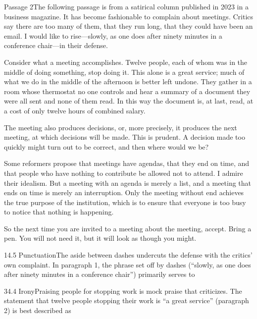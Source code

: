 \documentclass[11pt]{article}
\begin{document}
\begin{passage}{Passage 2}{The following passage is from a satirical column published in 2023 in a business magazine.}
 It has become fashionable to complain about meetings. Critics say there are too many of them, that they run long, that they could have been an email. I would like to rise---slowly, as one does after ninety minutes in a conference chair---in their defense.

 Consider what a meeting accomplishes. Twelve people, each of whom was in the middle of doing something, stop doing it. This alone is a great service; much of what we do in the middle of the afternoon is better left undone. They gather in a room whose thermostat no one controls and hear a summary of a document they were all sent and none of them read. In this way the document is, at last, read, at a cost of only twelve hours of combined salary.

 The meeting also produces decisions, or, more precisely, it produces the next meeting, at which decisions will be made. This is prudent. A decision made too quickly might turn out to be correct, and then where would we be?

 Some reformers propose that meetings have agendas, that they end on time, and that people who have nothing to contribute be allowed not to attend. I admire their idealism. But a meeting with an agenda is merely a list, and a meeting that ends on time is merely an interruption. Only the meeting without end achieves the true purpose of the institution, which is to ensure that everyone is too busy to notice that nothing is happening.

 So the next time you are invited to a meeting about the meeting, accept. Bring a pen. You will not need it, but it will look as though you might.
\end{passage}

\begin{q}{1}{4.5 Punctuation}{The aside between dashes undercuts the defense with the critics' own complaint.}
In paragraph 1, the phrase set off by dashes (``slowly, as one does after ninety minutes in a conference chair'') primarily serves to
\end{q}

\begin{q}{3}{4.4 Irony}{Praising people for stopping work is mock praise that criticizes.}
The statement that twelve people stopping their work is ``a great service'' (paragraph 2) is best described as
\end{q}
\end{document}
